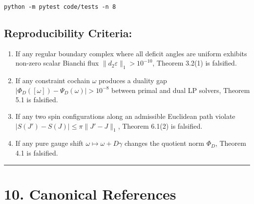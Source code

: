 \documentclass[11pt]{article}
\begin{document}
\begin{Verbatim}[breaklines=true,breakanywhere=true,fontsize=\small]
python -m pytest code/tests -n 8
\end{Verbatim}

\subsection{\texorpdfstring{Reproducibility Criteria:}{Reproducibility Criteria:}}

\begin{enumerate}[leftmargin=1.4em,itemsep=0.2em]
\item If any regular boundary complex where all deficit angles are uniform exhibits non-zero scalar Bianchi flux $\|d_2 \varepsilon\|_1 > 10^{-10}$, Theorem 3.2(1) is falsified.
\item If any constraint cochain $\omega$ produces a duality gap $|\Phi_D([\omega]) - \Psi_D(\omega)| > 10^{-8}$ between primal and dual LP solvers, Theorem 5.1 is falsified.
\item If any two spin configurations along an admissible Euclidean path violate $|S(J') - S(J)| \le \pi \|J' - J\|_1$, Theorem 6.1(2) is falsified.
\item If any pure gauge shift $\omega \mapsto \omega + D \gamma$ changes the quotient norm $\Phi_D$, Theorem 4.1 is falsified.
\end{enumerate}
\medskip\hrule\medskip
\section{\texorpdfstring{10. Canonical References}{10. Canonical References}}
\end{document}
